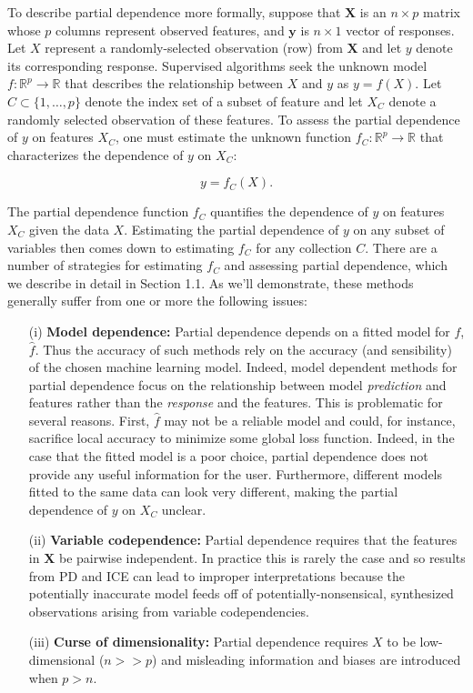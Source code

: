 \documentclass[12pt]{article}
\begin{document}
To describe partial dependence more formally, suppose that $\mathbf{X}$ is an $n \times p$ matrix whose $p$ columns represent observed features, and $\mathbf{y}$ is $n \times 1$ vector of responses. Let $X$ represent a randomly-selected observation (row) from $\mathbf{X}$ and let $y$ denote its corresponding response. Supervised algorithms seek the unknown model $f:\mathbb{R}^{p} \rightarrow \mathbb{R}$ that describes the relationship between $X$ and $y$ as ${y} = f({X}).$ Let $C \subset \{1, \ldots, p\}$ denote the index set of a subset of feature and let $X_C$ denote a randomly selected observation of these features. To assess the partial dependence of $y$ on features $X_C$, one must estimate the unknown function $f_C: \mathbb{R}^{p} \rightarrow \mathbb{R}$ that characterizes the dependence of $y$ on $X_C$:

\begin{equation}\label{problem}
	y = f_C(X).
\end{equation}


The partial dependence function $f_C$ quantifies the dependence of $y$ on features ${X}_C$ given the data $X$. Estimating the partial dependence of $y$ on any subset of variables then comes down to estimating $f_C$ for any collection $C$. There are a number of strategies for estimating $f_C$ and assessing partial dependence, which we describe in detail in Section 1.1. As we'll demonstrate, these methods generally suffer from one or more the following issues:

\begin{itemize}
	\item[(i)] {\bf Model dependence:} Partial dependence depends on a fitted model for $f$, $\widehat{f}$. Thus the accuracy of such methods rely on the accuracy (and sensibility) of the chosen machine learning model. Indeed, model dependent methods for partial dependence focus on the relationship between model \emph{prediction} and features rather than the \emph{response} and the features. This is problematic for several reasons. First, $\widehat{f}$ may not be a reliable model and could, for instance, sacrifice local accuracy to minimize some global loss function. Indeed, in the case that the fitted model is a poor choice, partial dependence does not provide any useful information for the user. Furthermore, different models fitted to the same data can look very different, making the partial dependence of $y$ on $X_C$ unclear.
	\item[(ii)] {\bf Variable codependence:} Partial dependence requires that the features in $\mathbf{X}$ be pairwise independent. In practice this is rarely the case and so results from PD and ICE can lead to improper interpretations because the potentially inaccurate model feeds off of potentially-nonsensical, synthesized observations arising from variable codependencies. 
	\item[(iii)] {\bf Curse of dimensionality:} Partial dependence requires $X$ to be low-dimensional ($n >> p$) and misleading information and biases are introduced when $p > n$. 
\end{itemize}
\end{document}
